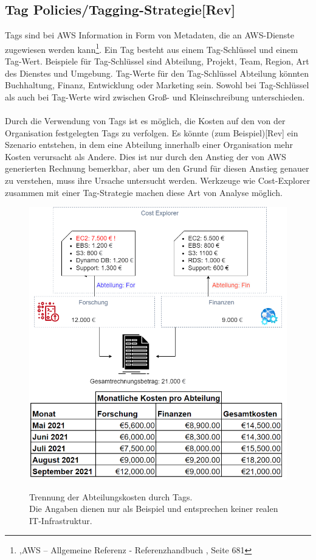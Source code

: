 \subsection*{Tag Policies/Tagging-Strategie[Rev]}
Tags sind bei AWS Information in Form von Metadaten, die an AWS-Dienste zugewiesen werden kann\footnote{\cite{AMZ29},AWS – Allgemeine Referenz - Referenzhandbuch
, Seite 681}. Ein Tag besteht aus einem Tag-Schlüssel und einem Tag-Wert. Beispiele für Tag-Schlüssel sind Abteilung, Projekt, Team, Region, Art des Dienstes und Umgebung. Tag-Werte für den Tag-Schlüssel Abteilung könnten Buchhaltung, Finanz, Entwicklung oder Marketing sein. Sowohl bei Tag-Schlüssel als auch bei Tag-Werte wird zwischen Groß- und Kleinschreibung unterschieden. 
\\\\
Durch die Verwendung von Tags ist es möglich, die Kosten auf den von der Organisation festgelegten Tags zu verfolgen. Es könnte (zum Beispiel)[Rev] ein Szenario entstehen, in dem eine Abteilung innerhalb einer Organisation mehr Kosten verursacht als Andere. Dies ist nur durch den Anstieg der von AWS generierten Rechnung bemerkbar, aber um den Grund für diesen Anstieg genauer zu verstehen, muss ihre Ursache untersucht werden. Werkzeuge wie Cost-Explorer zusammen mit einer Tag-Strategie machen diese Art von Analyse möglich.
\begin{figure}[h!]
  \centering
  \includegraphics[scale=0.5]{sources/BA Diagramme-Nach Abteilung.drawio}
  \caption[Trennung der Kosten durch Tags]{}
  \label{fig:BA Diagramme-Nach Abteilung.drawio} 
  Trennung der Abteilungskosten durch Tags.\\
  Die Angaben dienen nur als Beispiel und entsprechen keiner realen IT-Infrastruktur.
\end{figure} 
